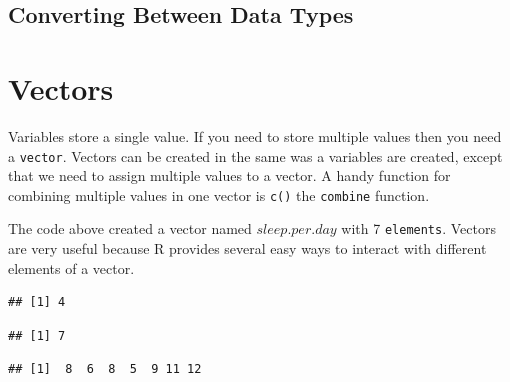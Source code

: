 \documentclass[10pt, letterpaper, twoside]{memoir}\usepackage{knitr}
\begin{document}
\subsection{Converting Between Data Types}

\section{Vectors}

Variables store a single value. If you need to store multiple values then you need a \texttt{vector}. Vectors can be created in the same was a variables are created, except that we need to assign multiple values to a vector. A handy function for combining multiple values in one vector is \texttt{c()} the \texttt{combine} function. 

\begin{knitrout}
\color{fgcolor}\begin{kframe}
\begin{alltt}
 \hlkwb{<-} \hlstd{(}\hlstd{,} \hlstd{,} \hlstd{,} \hlstd{,} \hlstd{,} \hlstd{,} \hlstd{)}
\end{alltt}
\end{kframe}
\end{knitrout}

The code above created a vector named $sleep.per.day$ with 7 \texttt{elements}. Vectors are very useful because R provides several easy ways to interact with different elements of a vector.

\begin{knitrout}
\color{fgcolor}\begin{kframe}
\begin{alltt}
\hlstd{sleep.per.day[}\hlstd{]}  
\end{alltt}
\begin{verbatim}
## [1] 4
\end{verbatim}
\begin{alltt}
\hlstd{sleep.per.day[}\hlstd{]} \hlkwb{<-}   
  
\end{alltt}
\begin{verbatim}
## [1] 7
\end{verbatim}
\begin{alltt}
 \hlopt{+}   
\end{alltt}
\begin{verbatim}
## [1]  8  6  8  5  9 11 12
\end{verbatim}
\end{kframe}
\end{knitrout}
\end{document}
